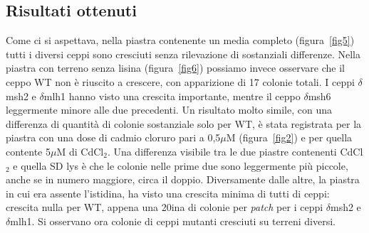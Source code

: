 \subsection*{Risultati ottenuti}
Come ci si aspettava, nella piastra contenente un media completo (figura~\ref{fig5})
tutti i diversi ceppi sono cresciuti senza rilevazione di sostanziali differenze. 
Nella piastra con terreno senza lisina (figura~\ref{fig6})
possiamo invece osservare che il ceppo WT non è riuscito a crescere, con apparizione di 17 colonie totali. 
I ceppi $\delta$msh2 e $\delta$mlh1 hanno visto una crescita importante, mentre il ceppo $\delta$msh6 leggermente minore alle due precedenti. 
Un risultato molto simile, con una differenza di quantità di colonie sostanziale solo per WT, è stata registrata per la piastra con una dose di cadmio cloruro pari a 0,5$\mu$M (figura~\ref{fig2}) e per quella contente 5$\mu$M di CdCl$_{2}$.
Una differenza visibile tra le due piastre contenenti CdCl$_{2}$ e quella SD lys è che le colonie nelle prime due sono leggermente più piccole, anche se in numero maggiore, circa il doppio. 
Diversamente dalle altre, la piastra in cui era assente l'istidina, ha visto una crescita minima di tutti di ceppi: crescita nulla per WT, appena una 20ina di colonie per \emph{patch} per i ceppi $\delta$msh2 e $\delta$mlh1. 
Si osservano ora colonie di ceppi mutanti cresciuti su terreni diversi.
